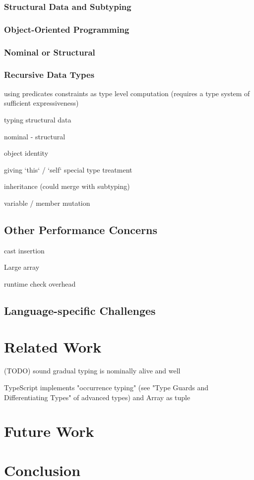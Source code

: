 \subsection{Structural Data and Subtyping}

\subsection{Object-Oriented Programming}

\subsection{Nominal or Structural}

\subsection{Recursive Data Types}

using predicates
constraints as type level computation (requires a type system of sufficient expressiveness)

typing structural data

nominal
- structural

object identity

giving `this` / `self` special type treatment

inheritance (could merge with subtyping)

variable / member mutation

\section{Other Performance Concerns}

cast insertion

Large array

runtime check overhead

\section{Language-specific Challenges}

\renewcommand{\thechapter}{4}
\chapter{Related Work}

(TODO) sound gradual typing is nominally alive and well


TypeScript implements "occurrence typing" (see "Type Guards and Differentiating Types" of advanced types) and Array as tuple 
\renewcommand{\thechapter}{5}

\chapter{Future Work}

\renewcommand{\thechapter}{6}
\chapter{Conclusion}